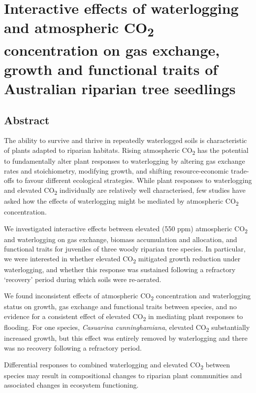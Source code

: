 \documentclass[12pt,a4paper]{memoir}
\begin{document}
\doublespacing


\chapter[glasshouse]{Interactive effects of waterlogging and atmospheric CO\textsubscript{2} concentration on gas exchange, growth and functional traits of Australian riparian tree seedlings}
\newpage

\section*{Abstract}
The ability to survive and thrive in repeatedly waterlogged soils is characteristic of plants adapted to riparian habitats. Rising atmospheric CO\textsubscript{2} has the potential to fundamentally alter plant responses to waterlogging by altering gas exchange rates and stoichiometry, modifying growth, and shifting resource-economic trade-offs to favour different ecological strategies. While plant responses to waterlogging and elevated CO\textsubscript{2} individually are relatively well characterised, few studies have asked how the effects of waterlogging might be mediated by atmospheric CO\textsubscript{2} concentration. 

We investigated interactive effects between elevated (550 ppm) atmospheric CO\textsubscript{2} and waterlogging on gas exchange, biomass accumulation and allocation, and functional traits for juveniles of three woody riparian tree species. In particular, we were interested in whether elevated CO\textsubscript{2} mitigated growth reduction under waterlogging, and whether this response was sustained following a refractory ‘recovery’ period during which soils were re-aerated. 

We found inconsistent effects of atmospheric CO\textsubscript{2} concentration and waterlogging status on growth, gas exchange and functional traits between species, and no evidence for a consistent effect of elevated CO\textsubscript{2} in mediating plant responses to flooding. For one species, \textit{Casuarina cunninghamiana}, elevated CO\textsubscript{2} substantially increased growth, but this effect was entirely removed by waterlogging and there was no recovery following a refractory period. 

Differential responses to combined waterlogging and elevated CO\textsubscript{2} between species may result in compositional changes to riparian plant communities and associated changes in ecosystem functioning.
\end{document}
